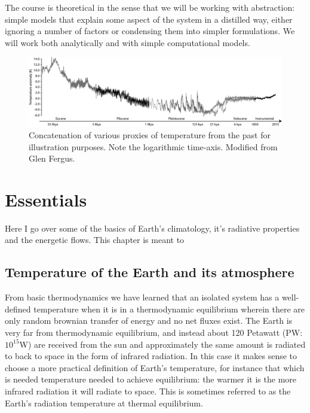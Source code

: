 \documentclass[12pt]{book}
\begin{document}
The course is theoretical in the sense that we will be working with abstraction: simple models that explain some aspect of the system in a distilled way, either ignoring a number of factors or condensing them into simpler formulations. We will work both analytically and with simple computational models. 


\begin{figure}
\begin{center}
\includegraphics[width=17 cm]{../external_figures/Paleo_temperature_timeseries}
\end{center}
\caption{ Concatenation of various proxies of temperature from the past for illustration purposes. Note the logarithmic time-axis. Modified from Glen Fergus. } 
\label{fig:Paleo_temperature_timeseries}
\end{figure}

\mainmatter
\chapter{Essentials}
\label{chapter:essentials}
Here I go over some of the basics of Earth's climatology, it's radiative properties and the energetic flows. This chapter is meant to 




\section{Temperature of the Earth and its atmosphere}
From basic thermodynamics we have learned that an isolated system has a well-defined temperature when it is in a thermodynamic equilibrium wherein there are only random brownian transfer of energy and no net fluxes exist. The Earth is very far from thermodynamic equilibrium, and instead about 120 Petawatt (PW: $10^{15}$W) are received from the sun and approximately the same amount is radiated to back to space in the form of infrared radiation. In this case it makes sense to choose a more practical definition of Earth's temperature, for instance that which is needed temperature needed to achieve equilibrium: the warmer it is the more infrared radiation it will radiate to space. This is sometimes referred to as the Earth's radiation temperature at thermal equilibrium.
\end{document}

